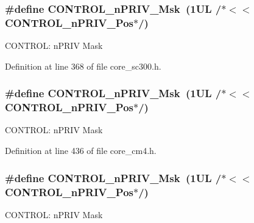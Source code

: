 \subsubsection[{\texorpdfstring{C\+O\+N\+T\+R\+O\+L\+\_\+n\+P\+R\+I\+V\+\_\+\+Msk}{CONTROL_nPRIV_Msk}}]{\setlength{\rightskip}{0pt plus 5cm}\#define C\+O\+N\+T\+R\+O\+L\+\_\+n\+P\+R\+I\+V\+\_\+\+Msk~(1\+U\+L /$\ast$$<$$<$ C\+O\+N\+T\+R\+O\+L\+\_\+n\+P\+R\+I\+V\+\_\+\+Pos$\ast$/)}\hypertarget{group___c_m_s_i_s___c_o_r_e_gaef3b20d77acb213338f89ce5e7bc36b0}{}\label{group___c_m_s_i_s___c_o_r_e_gaef3b20d77acb213338f89ce5e7bc36b0}
C\+O\+N\+T\+R\+OL\+: n\+P\+R\+IV Mask 

Definition at line 368 of file core\+\_\+sc300.\+h.

\subsubsection[{\texorpdfstring{C\+O\+N\+T\+R\+O\+L\+\_\+n\+P\+R\+I\+V\+\_\+\+Msk}{CONTROL_nPRIV_Msk}}]{\setlength{\rightskip}{0pt plus 5cm}\#define C\+O\+N\+T\+R\+O\+L\+\_\+n\+P\+R\+I\+V\+\_\+\+Msk~(1\+U\+L /$\ast$$<$$<$ C\+O\+N\+T\+R\+O\+L\+\_\+n\+P\+R\+I\+V\+\_\+\+Pos$\ast$/)}\hypertarget{group___c_m_s_i_s___c_o_r_e_gaef3b20d77acb213338f89ce5e7bc36b0}{}\label{group___c_m_s_i_s___c_o_r_e_gaef3b20d77acb213338f89ce5e7bc36b0}
C\+O\+N\+T\+R\+OL\+: n\+P\+R\+IV Mask 

Definition at line 436 of file core\+\_\+cm4.\+h.

\subsubsection[{\texorpdfstring{C\+O\+N\+T\+R\+O\+L\+\_\+n\+P\+R\+I\+V\+\_\+\+Msk}{CONTROL_nPRIV_Msk}}]{\setlength{\rightskip}{0pt plus 5cm}\#define C\+O\+N\+T\+R\+O\+L\+\_\+n\+P\+R\+I\+V\+\_\+\+Msk~(1\+U\+L /$\ast$$<$$<$ C\+O\+N\+T\+R\+O\+L\+\_\+n\+P\+R\+I\+V\+\_\+\+Pos$\ast$/)}\hypertarget{group___c_m_s_i_s___c_o_r_e_gaef3b20d77acb213338f89ce5e7bc36b0}{}\label{group___c_m_s_i_s___c_o_r_e_gaef3b20d77acb213338f89ce5e7bc36b0}
C\+O\+N\+T\+R\+OL\+: n\+P\+R\+IV Mask 

